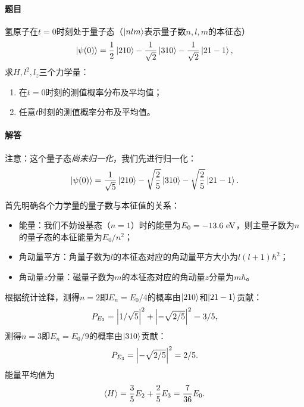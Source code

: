 \begin{tcolorbox}[breakable, title={\textbf{例题：氢原子能级叠加态}}]
    \paragraph{题目}
    氢原子在$t=0$时刻处于量子态（$\ket{nlm}$表示量子数$n,l,m$的本征态）
    \begin{equation}
        \ket{\psi(0)} = \frac12\ket{210} - \frac{1}{\sqrt{2}}\ket{310} - \frac{1}{\sqrt{2}}\ket{21-1},
    \end{equation}
    求$H, l^2, l_z$三个力学量：
    \begin{enumerate}
        \item{在$t=0$时刻的测值概率分布及平均值；}
        \item{任意$t$时刻的测值概率分布及平均值。}
    \end{enumerate}

    \paragraph{解答}

    注意：这个量子态\emph{尚未归一化}，我们先进行归一化：
    \begin{equation}
        \ket{\psi(0)} = \frac{1}{\sqrt{5}}\ket{210} - \sqrt{\frac25}\ket{310} - \sqrt{\frac25}\ket{21-1}.
    \end{equation}

    首先明确各个力学量的量子数与本征值的关系：
    \begin{itemize}
        \item{能量：我们不妨设基态（$n=1$）时的能量为$E_0=-13.6\ \rm{eV}$，则主量子数为$n$的量子态的本征能量为$E_0/n^2$；}
        \item{角动量平方：角量子数为$l$的本征态对应的角动量平方大小为$l(l+1)\hbar^2$；}
        \item{角动量$z$分量：磁量子数为$m$的本征态对应的角动量$z$分量为$m\hbar$。}
    \end{itemize}

    根据统计诠释，测得$n=2$即$E_n=E_0/4$的概率由$\ket{210}$和$\ket{21-1}$贡献：
    \begin{equation}
        P_{E_2} = \abs{1/\sqrt{5}}^2 + \abs{-\sqrt{2/5}}^2 = 3/5,
    \end{equation}
    测得$n=3$即$E_n=E_0/9$的概率由$\ket{310}$贡献：
    \begin{equation}
        P_{E_3} = \abs{-\sqrt{2/5}}^2 = 2/5.
    \end{equation}
    能量平均值为
    \begin{equation}
        \expval{H} = \frac35 E_2 + \frac25 E_3 = \frac{7}{36} E_0.
    \end{equation}


\end{tcolorbox}
